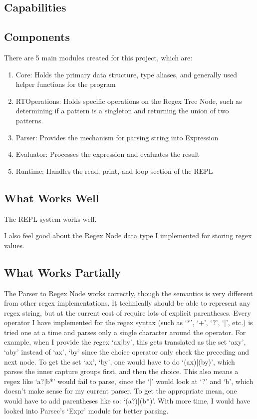 \documentclass[letterpaper, 11pt]{article}
\begin{document}
\subsection{Capabilities}\label{sec:capabilities}

\subsection{Components}\label{sec:components}
There are 5 main modules created for this project, which are:
\begin{enumerate}
    \item Core: Holds the primary data structure, type aliases, and generally used helper functions for the program
    \item RTOperations: Holds specific operations on the Regex Tree Node, such as determining if a pattern is a singleton and returning the union of two patterns.
    \item Parser: Provides the mechanism for parsing string into Expression
    \item Evaluator: Processes the expression and evaluates the result
    \item Runtime: Handles the read, print, and loop section of the REPL
\end{enumerate}

\subsection{What Works Well}\label{sec:working}
The REPL system works well.

I also feel good about the Regex Node data type I implemented for storing regex values.

\subsection{What Works Partially}\label{sec:partially}
The Parser to Regex Node works correctly, though the semantics is very different from other regex implementations.
It technically should be able to represent any regex string, but at the current cost of require lots of explicit parentheses.
Every operator I have implemented for the regex syntax (such as `*', `+', `?', `|', etc.) is tried one at a time and parses only a single character around the operator.
For example, when I provide the regex `ax|by', this gets translated as the set {`axy', `aby'} instead of {`ax', `by'} since the choice operator only check the preceding and next node.
To get the set {`ax', `by'}, one would have to do `(ax)|(by)', which parses the inner capture groups first, and then the choice.
This also means a regex like `a?|b*' would fail to parse, since the `|' would look at `?' and `b', which doesn't make sense for my current parser.
To get the appropriate mean, one would have to add parentheses like so: `(a?)|(b*)'.
With more time, I would have looked into Parsec's `Expr' module for better parsing.
\end{document}
